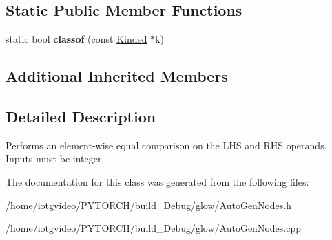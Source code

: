 \subsection*{Static Public Member Functions}
\begin{DoxyCompactItemize}
\item 
\mbox{\label{classglow_1_1_cmp_e_q_node_a45d2816ca9cf1994c4ea7f913bca14f3}} 
static bool {\bfseries classof} (const \hyperlink{classglow_1_1_kinded}{Kinded} $\ast$k)
\end{DoxyCompactItemize}
\subsection*{Additional Inherited Members}


\subsection{Detailed Description}
Performs an element-\/wise equal comparison on the L\+HS and R\+HS operands. Inputs must be integer. 

The documentation for this class was generated from the following files\+:\begin{DoxyCompactItemize}
\item 
/home/iotgvideo/\+P\+Y\+T\+O\+R\+C\+H/build\+\_\+\+Debug/glow/Auto\+Gen\+Nodes.\+h\item 
/home/iotgvideo/\+P\+Y\+T\+O\+R\+C\+H/build\+\_\+\+Debug/glow/Auto\+Gen\+Nodes.\+cpp\end{DoxyCompactItemize}
